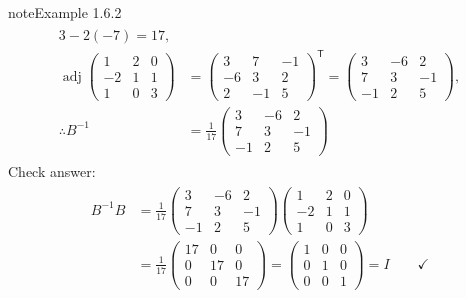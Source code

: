 \documentclass[letterpaper,10pt,english]{jupyterBook}
\begin{document}
\begin{sphinxadmonition}{note}{Example 1.6.2}
\begin{equation*}
\begin{split}
\begin{align*}
    3 - 2(-7) = 17, \\
    \operatorname{adj}\begin{pmatrix} 1 & 2 & 0 \\ -2 & 1 & 1 \\ 1 & 0 & 3 \end{pmatrix} &=
    \begin{pmatrix} 3 & 7 & -1 \\ -6 & 3 & 2 \\ 2 & -1 & 5 \end{pmatrix}^\mathsf{T} =
    \begin{pmatrix} 3 & -6 & 2 \\ 7 & 3 & -1 \\ -1 & 2 & 5 \end{pmatrix}, \\
    \therefore B^{-1} &= \frac{1}{17}\begin{pmatrix} 3 & -6 & 2 \\ 7 & 3 & -1 \\ -1 & 2 & 5 \end{pmatrix}
\end{align*} \end{split}
\end{equation*}
\sphinxAtStartPar
Check answer:
\begin{equation*}
\begin{split} \begin{align*}
    B^{-1}B &= \frac{1}{17}\begin{pmatrix} 3 & -6 & 2 \\ 7 & 3 & -1 \\ -1 & 2 & 5 \end{pmatrix}
    \begin{pmatrix} 1 & 2 & 0 \\ -2 & 1 & 1 \\ 1 & 0 & 3 \end{pmatrix} \\
    &= \frac{1}{17}\begin{pmatrix} 17 & 0 & 0 \\ 0 & 17 & 0 \\ 0 & 0 & 17 \end{pmatrix} =
    \begin{pmatrix} 1 & 0 & 0 \\ 0 & 1 & 0 \\ 0 & 0 & 1 \end{pmatrix} = I \qquad \checkmark
\end{align*} \end{split}

\end{equation*}
\end{sphinxadmonition}
\end{document}
